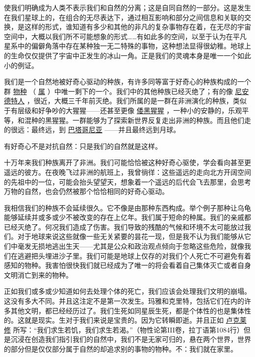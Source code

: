     使我们明确成为人类不表示我们和自然的分离；这是自同自然的一部分。这是发生在我们星球上的，在组合的无尽表达下，通过相互影响和部分之间信息和关联的交换，是这样的形式，谁知道有多少和其他的非凡的复杂事物存在着，在无尽的宇宙空间中，大概以我们所不可能想象的形式……有如此多的空间，以至于认为在平凡星系中的偏僻角落中存在某种独一无二特殊的事物，这种想法显得很幼稚。地球上的生命仅仅提供了宇宙中正发生的冰山一角。正是我们的灵魂本身是唯一一个如此小的例证。

    我们是一个自然地被好奇心驱动的种族，有许多同等富于好奇心的种族构成的一个群
\href{http://toyhouse.cc/wiki/index.php/物种}{物种}
（
\href{http://toyhouse.cc/wiki/index.php/属}{属}
）中唯一剩下的一个。我们中的其他种族已经灭绝了；有的像
\href{https://en.wikipedia.org/wiki/Neanderthals}{尼安德特人}
，很近，大概三千年前灭绝。我们所属的是一群在非洲演化的种族，类似于有层级和好争吵的大猩猩——还甚至更像
\href{https://en.wikipedia.org/wiki/bonobos}{倭黑猩猩}
，一种小的安静的，乐观平等，和混种的黑猩猩。一群能够为了探索新世界反复走出非洲的种族。而且他们走的很远：最终远，到
\href{https://en.wikipedia.org/wiki/Patagonia}{巴塔哥尼亚}
——并且最终远到月球。

    有好奇心不是对抗自然：只是我们的自然就是这样。
 
   十万年来我们种族离开了非洲。我们可能恰恰被这种好奇心驱使，学会看向甚至更遥远的彼方。在夜晚飞过非洲的航班上，我曾徜徉：这些遥远的走向北方开阔空间的先祖中的一位，可能会抬头望望天，想象着一个遥远的后代会飞去那里，会思考万物的自然，也会仍然被那个恰恰相同的好奇心驱动。

    我相信我们的种族不会延续很久。它不像是由那种东西构成。举个例子那种让乌龟能够延续并或多或少不被改变的存在上亿年。我们属于短命的种属。我们的亲戚都已经灭绝了。何况我们造成了伤害。我们导致的残酷的气候和环境不太可能放过我们。对于地球来说这些就像一些无关紧要的昙花一现，但是我不认为我们能够从它们中毫发无损地逃出生天——尤其是公众和政治观点倾向于忽略这些危险，就像我们在逃避把头埋进沙子里。我们可能是地球上仅存的对我们个人死亡不可避免有着感知的物种。我害怕很快我们就已经成为了唯一的将会看着自己集体灭亡或者自身文明消亡到来的物种。

    正如我们或多或少知道如何去处理个体的死亡，我们应该会处理我们文明的崩塌。这没有多大不同。并且这注定不是第一次发生。玛雅和克里特，包括它们在内的许多其他文明，都已经经历过了。我们生死如同星辰生死，都是个体性的也是集体性的。这就是现实。生对于我们来说是宝贵的。因为它转瞬即逝。并且正如
\href{https://en.wikipedia.org/wiki/Lucretius}{卢克莱修}
所写：“我们求生若饥，我们求生若渴。”（物性论第III卷，拉丁语第1084行）但是沉浸在创造我们指引我们的自然中，我们不是无家可归的，悬在两个世界，世界的部分但是仅仅部分属于自然的却追求别的事物的物种。不：我们就在家里。

